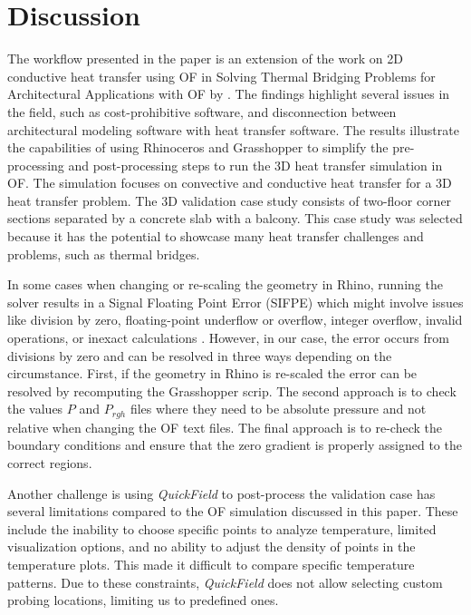 \section{Discussion}


The workflow presented in the paper is an extension of the work on 2D conductive heat transfer using \gls{OF} in Solving Thermal Bridging Problems for Architectural Applications with  \gls{OF} by \cite{kastner2020solving}. 
The findings highlight several issues in the field, such as cost-prohibitive software, and disconnection between architectural modeling software with heat transfer software. 
The results illustrate the capabilities of using Rhinoceros and Grasshopper to simplify the pre-processing and post-processing steps to run the 3D heat transfer simulation in  \gls{OF}. The simulation focuses on convective and conductive heat transfer for a 3D heat transfer problem. The 3D validation case study consists of two-floor corner sections separated by a concrete slab with a balcony. This case study was selected because it has the potential to showcase many heat transfer challenges and problems, such as thermal bridges.


In some cases when changing or re-scaling the geometry in Rhino, running the solver results in a Signal Floating Point Error (SIFPE) which might involve issues like division by zero, floating-point underflow or overflow, integer overflow, invalid operations, or inexact calculations \cite{sigfpe}. However, in our case, the error occurs from divisions by zero and can be resolved in three ways depending on the circumstance. First, if the geometry in Rhino is re-scaled the error can be resolved by recomputing the Grasshopper scrip. The second approach is to check the values $P$ and $P_{rgh}$ files where they need to be absolute pressure and not relative when changing the \gls{OF} text files. The final approach is to re-check the boundary conditions and ensure that the zero gradient is properly assigned to the correct regions.


Another challenge is using \textit{QuickField} to post-process the validation case has several limitations compared to the \gls{OF} simulation discussed in this paper. These include the inability to choose specific points to analyze temperature, limited visualization options, and no ability to adjust the density of points in the temperature plots. This made it difficult to compare specific temperature patterns.
Due to these constraints, \textit{QuickField} does not allow selecting custom probing locations, limiting us to predefined ones.





